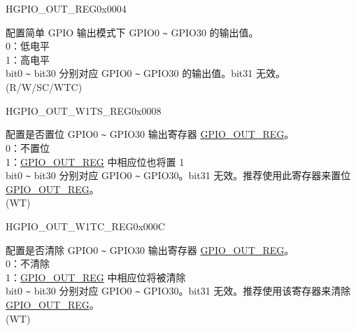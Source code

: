 

\begin{register}{H}{GPIO\_OUT\_REG}{0x0004}\label{regdesc:GPIOOUTREG}
%
\regnewline%
\begin{regdesc}\begin{reglist}
\label{fielddesc:GPIOOUTDATAORIG}\item [GPIO\_OUT\_DATA\_ORIG] 配置简单 GPIO 输出模式下 GPIO0 \verb+~+ GPIO30 的输出值。 \\
0：低电平\\
1：高电平\\
bit0 \verb+~+ bit30 分别对应 GPIO0 \verb+~+ GPIO30 的输出值。bit31 无效。\\
(R/W/SC/WTC)
\end{reglist}\end{regdesc}
\end{register}


\begin{register}{H}{GPIO\_OUT\_W1TS\_REG}{0x0008}\label{regdesc:GPIOOUTW1TSREG}
%
\regnewline%
\begin{regdesc}\begin{reglist}
\label{fielddesc:GPIOOUTW1TS}\item [GPIO\_OUT\_W1TS] 配置是否置位 GPIO0 \verb+~+ GPIO30 输出寄存器 \hyperref[regdesc:GPIOOUTREG]{GPIO\_OUT\_REG}。\\
0：不置位\\
1：\hyperref[regdesc:GPIOOUTREG]{GPIO\_OUT\_REG} 中相应位也将置 1\\
bit0 \verb+~+ bit30 分别对应 GPIO0 \verb+~+ GPIO30。bit31 无效。推荐使用此寄存器来置位 \hyperref[regdesc:GPIOOUTREG]{GPIO\_OUT\_REG}。\\
(WT)
\end{reglist}\end{regdesc}
\end{register}


\begin{register}{H}{GPIO\_OUT\_W1TC\_REG}{0x000C}\label{regdesc:GPIOOUTW1TCREG}
%
\regnewline%
\begin{regdesc}\begin{reglist}
\label{fielddesc:GPIOOUTW1TC}\item [GPIO\_OUT\_W1TC] 配置是否清除 GPIO0 \verb+~+ GPIO30 输出寄存器 \hyperref[regdesc:GPIOOUTREG]{GPIO\_OUT\_REG}。\\
0：不清除\\
1：\hyperref[regdesc:GPIOOUTREG]{GPIO\_OUT\_REG} 中相应位将被清除\\
bit0 \verb+~+ bit30 分别对应 GPIO0 \verb+~+ GPIO30。bit31 无效。推荐使用该寄存器来清除 \hyperref[regdesc:GPIOOUTREG]{GPIO\_OUT\_REG}。\\
(WT)
\end{reglist}\end{regdesc}
\end{register}


